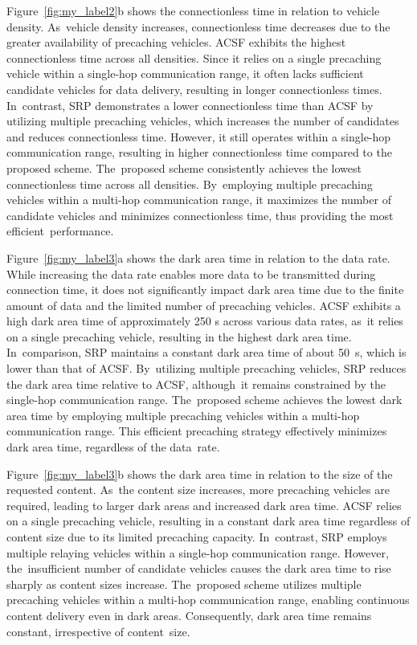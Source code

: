\documentclass[electronics,aricle,accept,pdftex,moreauthors]{Definitions/mdpi}
\begin{document}
Figure~\ref{fig:my_label2}b shows the connectionless time in relation to vehicle density. As~vehicle density increases, connectionless time decreases due to the greater availability of precaching vehicles. ACSF exhibits the highest connectionless time across all densities. Since it relies on a single precaching vehicle within a single-hop communication range, it often lacks sufficient candidate vehicles for data delivery, resulting in longer connectionless times. In~contrast, SRP demonstrates a lower connectionless time than ACSF by utilizing multiple precaching vehicles, which increases the number of candidates and reduces connectionless time. However, it still operates within a single-hop communication range, resulting in higher connectionless time compared to the proposed scheme. The~proposed scheme consistently achieves the lowest connectionless time across all densities. By~employing multiple precaching vehicles within a multi-hop communication range, it maximizes the number of candidate vehicles and minimizes connectionless time, thus providing the most efficient~performance.


Figure~\ref{fig:my_label3}a shows the dark area time in relation to the data rate. While increasing the data rate enables more data to be transmitted during connection time, it does not significantly impact dark area time due to the finite amount of data and the limited number of precaching vehicles. ACSF exhibits a high dark area time of approximately 250 s across various data rates, as~it relies on a single precaching vehicle, resulting in the highest dark area time. In~comparison, SRP maintains a constant dark area time of about 50~s, which is lower than that of ACSF. By~utilizing multiple precaching vehicles, SRP reduces the dark area time relative to ACSF, although~it remains constrained by the single-hop communication range. The~proposed scheme achieves the lowest dark area time by employing multiple precaching vehicles within a multi-hop communication range. This efficient precaching strategy effectively minimizes dark area time, regardless of the data~rate.





Figure~\ref{fig:my_label3}b shows the dark area time in relation to the size of the requested content. As~the content size increases, more precaching vehicles are required, leading to larger dark areas and increased dark area time. ACSF relies on a single precaching vehicle, resulting in a constant dark area time regardless of content size due to its limited precaching capacity. In~contrast, SRP employs multiple relaying vehicles within a single-hop communication range. However, the~insufficient number of candidate vehicles causes the dark area time to rise sharply as content sizes increase. The~proposed scheme utilizes multiple precaching vehicles within a multi-hop communication range, enabling continuous content delivery even in dark areas. Consequently, dark area time remains constant, irrespective of content~size.
\end{document}
